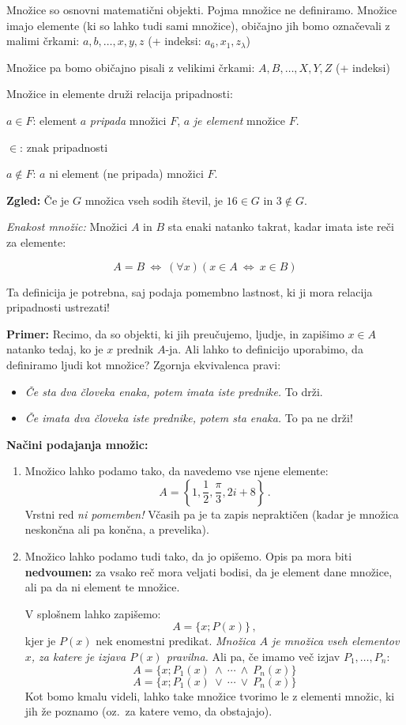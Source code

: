 \documentclass[11pt,paper=b5,footinclude,headinclude]{scrbook} %
\def\ali {{~\vee~}}
\def\inn {{~\wedge~}}
\def\cee {{~\Leftrightarrow~}}
\begin{document}
{
\indent Množice so osnovni matematični objekti. Pojma množice ne definiramo.
Množice imajo elemente (ki so lahko tudi sami množice), običajno jih bomo označevali z malimi črkami:
$a,b,\ldots, x,y,z$ (+ indeksi: $a_6, x_1, z_\lambda$)

\smallskip

Množice pa bomo običajno pisali z velikimi črkami: $A,B,\ldots, X,Y,Z$ (+ indeksi)

\smallskip
Množice in elemente druži relacija pripadnosti:

$a\in F$: element $a$ \emph{ pripada} množici $F$, $a$ \emph{ je element} množice $F$.

\smallskip

$\in$: znak pripadnosti

\smallskip
$a\not\in F$: $a$ ni element (ne pripada) množici $F$.

\smallskip

\textbf{ Zgled:}
Če je $G$ množica vseh sodih števil, je $16\in G$ in $3\not\in G$.


\medskip
{\em Enakost množic:} Množici $A$ in $B$ sta enaki natanko takrat, kadar imata iste reči za elemente:

$$A = B \cee (\forall x) (x\in A\cee x\in B)$$

\medskip
Ta definicija je potrebna, saj podaja pomembno lastnost, ki ji mora relacija pripadnosti ustrezati!

\textbf{ Primer:} Recimo, da so objekti, ki jih preučujemo, ljudje,
in zapišimo $x\in A$ natanko tedaj, ko je $x$ prednik $A$-ja.
Ali lahko to definicijo uporabimo, da definiramo ljudi kot množice?
Zgornja ekvivalenca pravi:
\begin{itemize}
  \item {\em Če sta dva človeka enaka, potem imata iste prednike.} To drži.
  \item {\em Če imata dva človeka iste prednike, potem sta enaka.} To pa ne drži!
\end{itemize}

\noindent\textbf{ Načini podajanja množic:}
\begin{enumerate}
  \item Množico lahko podamo tako, da navedemo vse njene elemente:
$$A = \left\{1,\frac{1}{2}, \frac{\pi}{3}, 2i+8\right\}\,.$$
Vrstni red {\em ni pomemben!}
Včasih pa je ta zapis nepraktičen (kadar je množica neskončna ali pa končna, a prevelika).
  \item Množico lahko podamo tudi tako, da jo opišemo. Opis pa mora biti \textbf{ nedvoumen:}
za vsako reč mora veljati bodisi, da je element dane množice, ali pa da ni element te množice.

V splošnem lahko zapišemo:
$$A = \{x; P(x)\}\,,$$
kjer je $P(x)$ nek enomestni predikat.
{\em Množica $A$ je množica vseh elementov $x$, za katere je izjava $P(x)$ pravilna.}
Ali pa, če imamo več izjav $P_1,\ldots, P_n$:
$$A = \{x; P_1(x)\inn \cdots\inn P_n(x)\}$$
$$A = \{x; P_1(x)\ali \cdots\ali P_n(x)\}$$
Kot bomo kmalu videli, lahko take množice tvorimo le z elementi množic, ki jih že poznamo (oz.~za katere vemo, da obstajajo).
\end{enumerate}
}
\end{document}
